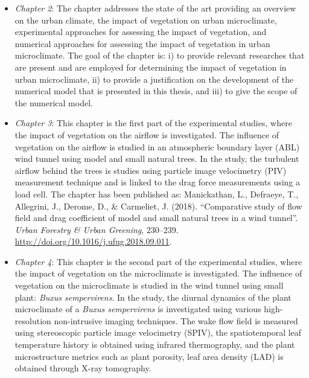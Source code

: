 \begin{itemize}
	\item \textit{Chapter 2}: The chapter addresses the state of the art providing an overview on the urban climate, the impact of vegetation on urban microclimate, experimental approaches for assessing the impact of vegetation, and numerical approaches for assessing the impact of vegetation in urban microclimate. The goal of the chapter is: i) to provide relevant researches that are present and are employed for determining the impact of vegetation in urban microclimate, ii) to provide a justification on the development of the numerical model that is presented in this thesis, and iii) to give the scope of the numerical model. 

	\item \textit{Chapter 3}: This chapter is the first part of the experimental studies, where the impact of vegetation on the airflow is investigated. The influence of vegetation on the airflow is studied in an atmospheric boundary layer (ABL) wind tunnel using model and small natural trees. In the study, the turbulent airflow behind the trees is studies using particle image velocimetry (PIV) measurement technique and is linked to the drag force measurements using a load cell. The chapter has been published as: Manickathan, L., Defraeye, T., Allegrini, J., Derome, D., \& Carmeliet, J. (2018). ``Comparative study of flow field and drag coefficient of model and small natural trees in a wind tunnel''. \textit{Urban Forestry \& Urban Greening}, 230–239. \url{http://doi.org/10.1016/j.ufug.2018.09.011}.
	
	\item \textit{Chapter 4}: This chapter is the second part of the experimental studies, where the impact of vegetation on the microclimate is investigated. The influence of vegetation on the microclimate is studied in the wind tunnel using small plant: \textit{Buxus sempervirens}. In the study, the diurnal dynamics of the plant microclimate of a \textit{Buxus sempervirens} is investigated using various high-resolution non-intrusive imaging techniques. The wake flow field is measured using stereoscopic particle image velocimetry (SPIV), the spatiotemporal leaf temperature history is obtained using infrared thermography, and the plant microstructure metrics such as plant porosity, leaf area density (LAD) is obtained through X-ray tomography. %
	

\end{itemize}
